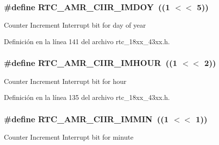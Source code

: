 \subsubsection[{\texorpdfstring{R\+T\+C\+\_\+\+A\+M\+R\+\_\+\+C\+I\+I\+R\+\_\+\+I\+M\+D\+OY}{RTC_AMR_CIIR_IMDOY}}]{\setlength{\rightskip}{0pt plus 5cm}\#define R\+T\+C\+\_\+\+A\+M\+R\+\_\+\+C\+I\+I\+R\+\_\+\+I\+M\+D\+OY~((1 $<$$<$ 5))}\hypertarget{group___r_t_c__18_x_x__43_x_x_gaec7d51e7a503514c1d71bf9428c6f3e8}{}\label{group___r_t_c__18_x_x__43_x_x_gaec7d51e7a503514c1d71bf9428c6f3e8}
Counter Increment Interrupt bit for day of year 

Definición en la línea 141 del archivo rtc\+\_\+18xx\+\_\+43xx.\+h.

\subsubsection[{\texorpdfstring{R\+T\+C\+\_\+\+A\+M\+R\+\_\+\+C\+I\+I\+R\+\_\+\+I\+M\+H\+O\+UR}{RTC_AMR_CIIR_IMHOUR}}]{\setlength{\rightskip}{0pt plus 5cm}\#define R\+T\+C\+\_\+\+A\+M\+R\+\_\+\+C\+I\+I\+R\+\_\+\+I\+M\+H\+O\+UR~((1 $<$$<$ 2))}\hypertarget{group___r_t_c__18_x_x__43_x_x_ga4e20983ef05abf10773186d3193270f9}{}\label{group___r_t_c__18_x_x__43_x_x_ga4e20983ef05abf10773186d3193270f9}
Counter Increment Interrupt bit for hour 

Definición en la línea 135 del archivo rtc\+\_\+18xx\+\_\+43xx.\+h.

\subsubsection[{\texorpdfstring{R\+T\+C\+\_\+\+A\+M\+R\+\_\+\+C\+I\+I\+R\+\_\+\+I\+M\+M\+IN}{RTC_AMR_CIIR_IMMIN}}]{\setlength{\rightskip}{0pt plus 5cm}\#define R\+T\+C\+\_\+\+A\+M\+R\+\_\+\+C\+I\+I\+R\+\_\+\+I\+M\+M\+IN~((1 $<$$<$ 1))}\hypertarget{group___r_t_c__18_x_x__43_x_x_ga3d67e7c72ec7bcd0831628841496cbc6}{}\label{group___r_t_c__18_x_x__43_x_x_ga3d67e7c72ec7bcd0831628841496cbc6}
Counter Increment Interrupt bit for minute 

